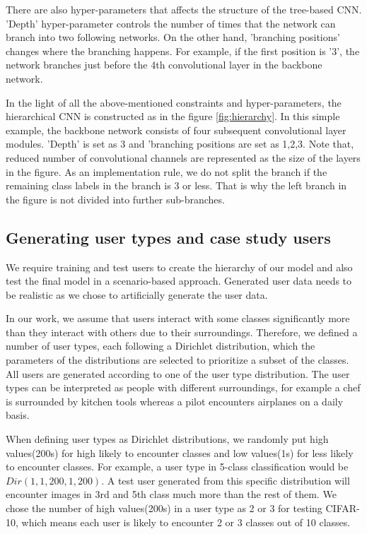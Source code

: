 There are also hyper-parameters that affects the structure of the tree-based CNN. 
'Depth' hyper-parameter controls the number of times that the network can branch into two following networks. 
On the other hand, 'branching positions' changes where the branching happens.
For example, if the first position is '3', the network branches just before the 4th convolutional layer in the backbone network.

In the light of all the above-mentioned constraints and hyper-parameters, the hierarchical CNN is constructed as in the figure \ref{fig:hierarchy}. 
In this simple example, the backbone network consists of four subsequent convolutional layer modules. 
'Depth' is set as 3 and 'branching positions are set as 1,2,3. 
Note that, reduced number of convolutional channels are represented as the size of the layers in the figure.
As an implementation rule, we do not split the branch if the remaining class labels in the branch is 3 or less. 
That is why the left branch in the figure is not divided into further sub-branches.

\subsection{Generating user types and case study users}

\label{ssec:genusers}

We require training and test users to create the hierarchy of our model and also test the final model in a scenario-based approach. 
Generated user data needs to be realistic as we chose to artificially generate the user data.

In our work, we assume that users interact with some classes significantly more than they interact with others due to their surroundings. 
Therefore, we defined a number of user types, each following a Dirichlet distribution, 
which the parameters of the distributions are selected to prioritize a subset of the classes. 
All users are generated according to one of the user type distribution. 
The user types can be interpreted as people with different surroundings, 
for example a chef is surrounded by kitchen tools whereas a pilot encounters airplanes on a daily basis.

When defining user types as Dirichlet distributions, we randomly put high values(200s) for high likely to encounter classes and low values(1s) for less likely to encounter classes. For example, a user type in 5-class classification would be $Dir(1,1,200,1,200)$. 
A test user generated from this specific distribution will encounter images in 3rd and 5th class much more than the rest of them. 
We chose the number of high values(200s) in a user type as 2 or 3 for testing CIFAR-10, which means each user is likely to encounter 2 or 3 classes out of 10 classes. 

